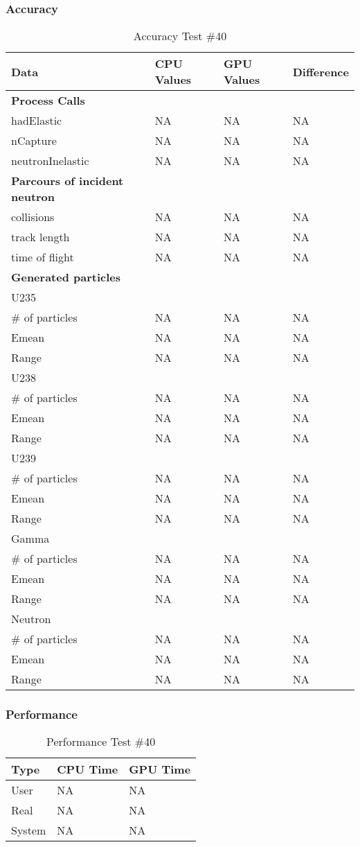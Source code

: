\documentclass[12pt]{article}
\begin{document}
	\subsubsection{Accuracy}
		\begin{table}[!htbp]
		\centering
		\caption{Accuracy Test \#40}\label{_acc}
		\begin{tabular}{llll}
		\toprule
		\bf Data & CPU Values & GPU Values & Difference\\\midrule
		\bf Process Calls&&&\\
		hadElastic&NA&NA&NA\\
		nCapture&NA&NA&NA\\
		neutronInelastic&NA&NA&NA\\ 
		\bf Parcours of incident neutron&&&\\
		collisions&NA&NA&NA\\
		track length&NA&NA&NA\\
		time of flight&NA&NA&NA\\
		\bf Generated particles&&&\\
		U235&&&\\
		\# of particles&NA&NA&NA\\
		Emean&NA&NA&NA\\
		Range&NA&NA&NA\\
		U238&&&\\
		\# of particles&NA&NA&NA\\
		Emean&NA&NA&NA\\
		Range&NA&NA&NA\\
		U239&&&\\
		\# of particles&NA&NA&NA\\
		Emean&NA&NA&NA\\
		Range&NA&NA&NA\\
		Gamma&&&\\
		\# of particles&NA&NA&NA\\
		Emean&NA&NA&NA\\
		Range&NA&NA&NA\\
		Neutron&&&\\
		\# of particles&NA&NA&NA\\
		Emean&NA&NA&NA\\
		Range&NA&NA&NA\\
		\end{tabular}
		\end{table}
		\break
	\subsubsection{Performance}
		\begin{table}[!htbp]
		\centering
		\caption{Performance Test \#40}\label{_acc}
		\begin{tabular}{lll}
		\toprule
		Type&CPU Time& GPU Time\\\midrule
		User&NA&NA\\
		Real&NA&NA\\
		System&NA&NA\\
		\end{tabular}
		\end{table}
\end{document}
